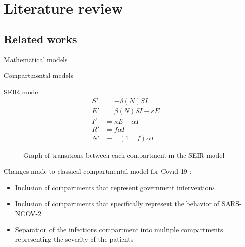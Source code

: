 \section{Literature review}

\subsection{Related works}

\begin{frame}[allowframebreaks]{Mathematical models}

    Compartmental models \cite{brauerCompartmentalModelsEpidemiology2008}

    \begin{block}{\gls{SEIR} model}
        \begin{equation*}
            \begin{aligned}
                S' &= - \beta(N)SI \\
                E' &= \beta(N)SI - \kappa E \\
                I' &= \kappa E - \alpha I \\
                R' &= f \alpha I \\
                N' &= - (1 - f) \alpha I
            \end{aligned}
        \end{equation*}
    \end{block}

    \framebreak

    \begin{figure}
        \centering
        \caption[SEIR model transitions]{Graph of transitions between each compartment in the SEIR model}
        \label{fig:seir-model-transition-graph}
    \end{figure}

    \framebreak

    Changes made to classical compartmental model for Covid-19 \cite{zhaoModelingEpidemicDynamics2020,heSEIRModelingCOVID192020,ndairouMathematicalModelingCOVID192020,bastosModelingForecastingEarly2020,sarkarModelingForecastingCOVID192020}:
    \begin{itemize}
        \item Inclusion of compartments that represent government interventions
        \item Inclusion of compartments that specifically represent the behavior of SARS-NCOV-2
        \item Separation of the infectious compartment into multiple compartments representing the severity of the patients
    \end{itemize}


\end{frame}
